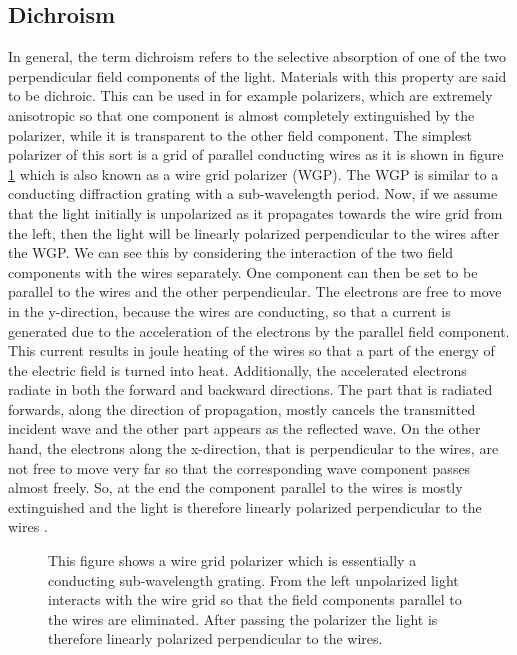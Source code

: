 \subsection{Dichroism}
\label{sec:dichroism}
In general, the term dichroism refers to the selective absorption of one of the two perpendicular field components of the light. Materials with this property are said to be dichroic. This can be used in for example polarizers, which are extremely anisotropic so that one component is almost completely extinguished by the polarizer, while it is transparent to the other field component. The simplest polarizer of this sort is a grid of parallel conducting wires as it is shown in figure \ref{fig:wire_grid_polarizer} which is also known as a wire grid polarizer (WGP). The WGP is similar to a conducting diffraction grating with a sub-wavelength period. Now, if we assume that the light initially is unpolarized as it propagates towards the wire grid from the left, then the light will be linearly polarized perpendicular to the wires after the WGP. We can see this by considering the interaction of the two field components with the wires separately. One component can then be set to be parallel to the wires and the other perpendicular. The electrons are free to move in the y-direction, because the wires are conducting, so that a current is generated due to the acceleration of the electrons by the parallel field component. This current results in joule heating of the wires so that a part of the energy of the electric field is turned into heat. Additionally, the accelerated electrons radiate in both the forward and backward directions. The part that is radiated forwards, along the direction of propagation, mostly cancels the transmitted incident wave and the other part appears as the reflected wave. On the other hand, the electrons along the x-direction, that is perpendicular to the wires, are not free to move very far so that the corresponding wave component passes almost freely. So, at the end the component parallel to the wires is mostly extinguished and the light is therefore linearly polarized perpendicular to the wires \cite{HechtOpticsEdition}.

\begin{figure}[h]
    \centering
    
    \caption{This figure shows a wire grid polarizer which is essentially a conducting sub-wavelength grating. From the left unpolarized light interacts with the wire grid so that the field components parallel to the wires are eliminated. After passing the polarizer the light is therefore linearly polarized perpendicular to the wires.}
    \label{fig:wire_grid_polarizer}
\end{figure}

